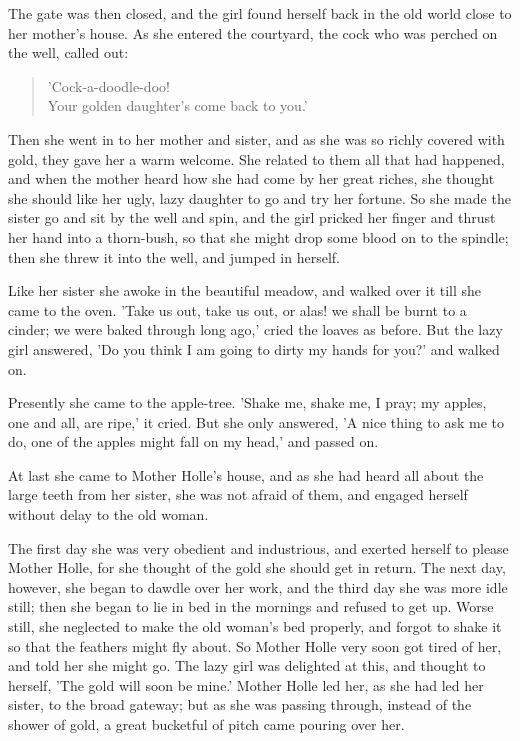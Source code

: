 \documentclass[12pt]{book}
\begin{document}
The gate was then closed, and the girl found herself back in the old
world close to her mother's house. As she entered the courtyard, the
cock who was perched on the well, called out:

\begin{verse}
 'Cock-a-doodle-doo!\\
  Your golden daughter's come back to you.'
\end{verse}

Then she went in to her mother and sister, and as she was so richly
covered with gold, they gave her a warm welcome. She related to them
all that had happened, and when the mother heard how she had come by
her great riches, she thought she should like her ugly, lazy daughter
to go and try her fortune. So she made the sister go and sit by the
well and spin, and the girl pricked her finger and thrust her hand
into a thorn-bush, so that she might drop some blood on to the
spindle; then she threw it into the well, and jumped in herself.

Like her sister she awoke in the beautiful meadow, and walked over it
till she came to the oven. 'Take us out, take us out, or alas! we
shall be burnt to a cinder; we were baked through long ago,' cried the
loaves as before. But the lazy girl answered, 'Do you think I am going
to dirty my hands for you?' and walked on.

Presently she came to the apple-tree. 'Shake me, shake me, I pray; my
apples, one and all, are ripe,' it cried. But she only answered, 'A
nice thing to ask me to do, one of the apples might fall on my head,'
and passed on.

At last she came to Mother Holle's house, and as she had heard all
about the large teeth from her sister, she was not afraid of them, and
engaged herself without delay to the old woman.

The first day she was very obedient and industrious, and exerted
herself to please Mother Holle, for she thought of the gold she should
get in return. The next day, however, she began to dawdle over her
work, and the third day she was more idle still; then she began to lie
in bed in the mornings and refused to get up. Worse still, she
neglected to make the old woman's bed properly, and forgot to shake it
so that the feathers might fly about. So Mother Holle very soon got
tired of her, and told her she might go. The lazy girl was delighted
at this, and thought to herself, 'The gold will soon be mine.' Mother
Holle led her, as she had led her sister, to the broad gateway; but as
she was passing through, instead of the shower of gold, a great
bucketful of pitch came pouring over her.
\end{document}
